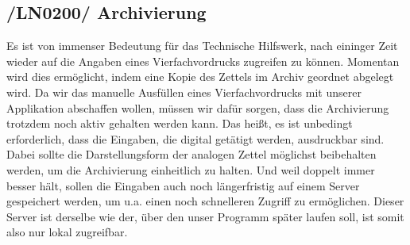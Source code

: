 \subsection{/LN0200/ Archivierung}
Es ist von immenser Bedeutung für das Technische Hilfswerk, nach eininger Zeit wieder auf die Angaben eines Vierfachvordrucks
zugreifen zu können. Momentan wird dies ermöglicht, indem eine Kopie des Zettels im Archiv geordnet abgelegt wird. Da wir das manuelle Ausfüllen eines Vierfachvordrucks mit unserer Applikation abschaffen wollen, müssen wir dafür sorgen, dass die Archivierung trotzdem noch aktiv gehalten werden kann. Das heißt, es ist unbedingt erforderlich, dass die Eingaben, die digital getätigt werden, ausdruckbar sind. Dabei sollte die Darstellungsform der analogen Zettel möglichst beibehalten werden, um die Archivierung einheitlich zu halten. Und weil doppelt immer besser hält, sollen die Eingaben auch noch längerfristig auf einem Server gespeichert werden, um u.a. einen noch schnelleren Zugriff zu ermöglichen. Dieser Server ist derselbe wie der, über den unser Programm später laufen soll, ist somit also nur lokal zugreifbar.